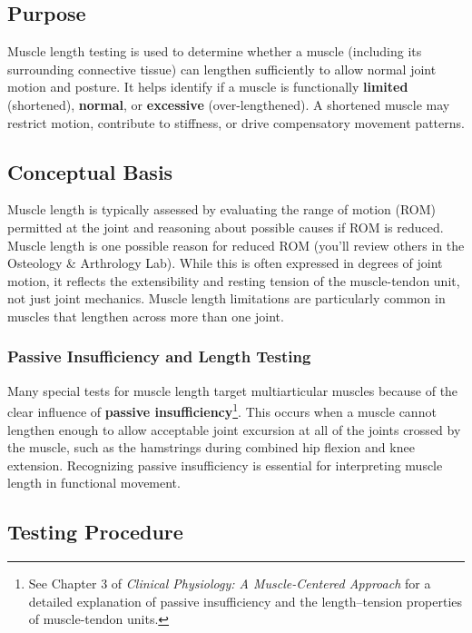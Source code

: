 \subsection*{Purpose}
Muscle length testing is used to determine whether a muscle (including its surrounding connective tissue) can lengthen sufficiently to allow normal joint motion and posture. It helps identify if a muscle is functionally \textbf{limited} (shortened), \textbf{normal}, or \textbf{excessive} (over-lengthened). A shortened muscle may restrict motion, contribute to stiffness, or drive compensatory movement patterns. 

\subsection*{Conceptual Basis}

Muscle length is typically assessed by evaluating the range of motion (ROM) permitted at the joint and reasoning about possible causes if ROM is reduced. Muscle length is one possible reason for reduced ROM (you'll review others in the Osteology \& Arthrology Lab). While this is often expressed in degrees of joint motion, it reflects the extensibility and resting tension of the muscle-tendon unit, not just joint mechanics. Muscle length limitations are particularly common in muscles that lengthen across more than one joint.

\subsubsection*{Passive Insufficiency and Length Testing}

Many special tests for muscle length target multiarticular muscles because of the clear influence of \textbf{passive insufficiency}\footnote{See Chapter 3 of \textit{Clinical Physiology: A Muscle-Centered Approach} for a detailed explanation of passive insufficiency and the length–tension properties of muscle-tendon units.}. This occurs when a muscle cannot lengthen enough to allow acceptable joint excursion at all of the joints crossed by the muscle, such as the hamstrings during combined hip flexion and knee extension. Recognizing passive insufficiency is essential for interpreting muscle length in functional movement.

\subsection*{Testing Procedure}

